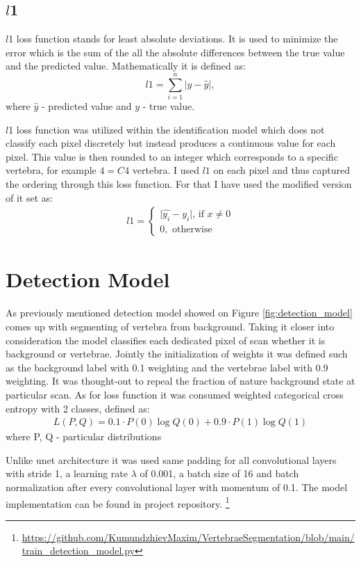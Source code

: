 \subsection{$l$1}
$l$1 loss function stands for least absolute deviations. It is used to minimize the error which is the sum of the all the absolute differences between the true value and the predicted value. Mathematically it is defined as: 
\[ \text{$l$1} = \sum_{i=1}^n |y - \hat{y}| , \]
where $\hat{y}$ - predicted value and $y$ - true value.

$l$1 loss function was utilized within the identification model which does not classify each pixel discretely but instead produces a continuous value for each pixel. This value is then rounded to an integer which corresponds to a specific vertebra, for example $4 = C4$ vertebra. 
I used $l1$ on each pixel and thus captured the ordering through this loss function. For that I have used the modified version of it set as: 
\begin{align*}
 \text{$l1$} = \begin{cases} \lvert \hat{y_i} - y_i \rvert \mbox{, if } x\mbox{$\neq 0$} \\ 0, \mbox{ otherwise} \end{cases}
\end{align*}


\section{Detection Model}
As previously mentioned detection model showed on Figure \ref{fig:detection_model} comes up with segmenting of vertebra from background. Taking it closer into consideration the model classifies each dedicated pixel of scan whether it is background or vertebrae. Jointly the initialization of weights it was  defined such as the background label with 0.1 weighting and the vertebrae label with 0.9 weighting. It was thought-out to repeal the fraction of nature background state at particular scan. As for loss function it was consumed \cite{Zhang2018} weighted categorical cross entropy with 2 classes, defined as:
\begin{align*}
 L(P, Q) = 0.1 \cdot P(0)\log Q(0) + 0.9 \cdot P(1)\log Q(1)
\end{align*}
where P, Q - particular distributions 

Unlike unet architecture it was used same padding for all convolutional layers with stride 1, a learning rate
$\lambda$ of 0.001, a batch size of 16 and batch normalization after every convolutional layer with momentum of 0.1. The model implementation can be found in project repository.
\footnote{ \url{https://github.com/KumundzhievMaxim/VertebraeSegmentation/blob/main/train_detection_model.py}}

